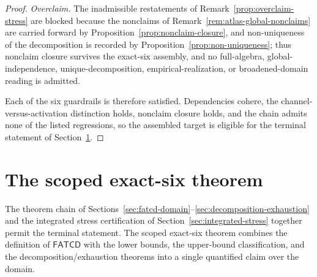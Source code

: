 \documentclass[11pt]{article}
\theoremstyle{definition}
\newcommand{\FATCD}{\ensuremath{\mathsf{FATCD}}}
\begin{document}
\begin{proof}
\emph{Overclaim.} The inadmissible restatements of
Remark~\ref{prop:overclaim-stress} are blocked because the nonclaims of
Remark~\ref{rem:atlas-global-nonclaims} are carried forward by
Proposition~\ref{prop:nonclaim-closure}, and non-uniqueness of the
decomposition is recorded by Proposition~\ref{prop:non-uniqueness}; thus
nonclaim closure survives the exact-six assembly, and no full-algebra,
global-independence, unique-decomposition, empirical-realization, or
broadened-domain reading is admitted.

Each of the six guardrails is therefore satisfied. Dependencies cohere,
the channel-versus-activation distinction holds, nonclaim closure holds,
and the chain admits none of the listed regressions, so the assembled
target is eligible for the terminal statement of
Section~\ref{sec:scoped-exact-six}.
\end{proof}
 \section{The scoped exact-six theorem}\label{sec:scoped-exact-six}




The theorem chain of
Sections~\ref{sec:fatcd-domain}--\ref{sec:decomposition-exhaustion}
and the integrated stress certification of
Section~\ref{sec:integrated-stress} together permit the terminal
statement. The scoped exact-six theorem combines the definition of
\FATCD{} with the lower bounds, the upper-bound classification, and
the decomposition/exhaustion theorems into a single quantified claim
over the domain.
\end{document}
